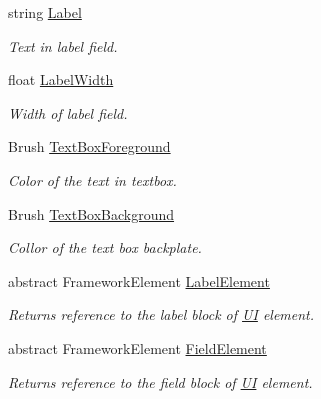 \begin{DoxyCompactItemize}
string \mbox{\hyperlink{class_wpf_handler_1_1_u_i_1_1_controls_1_1_text_field_control_a10cec1ad9b5fb5bb48d59e07d4cf2675}{Label}}
\begin{DoxyCompactList}\small\item\em Text in label field. \end{DoxyCompactList}\item 
float \mbox{\hyperlink{class_wpf_handler_1_1_u_i_1_1_controls_1_1_text_field_control_ab2089e6e1caddd925e2fa23d0ce481cb}{Label\+Width}}
\begin{DoxyCompactList}\small\item\em Width of label field. \end{DoxyCompactList}\item 
Brush \mbox{\hyperlink{class_wpf_handler_1_1_u_i_1_1_controls_1_1_text_field_control_a3ae60ed0a18d02385cb019fc9857b6d0}{Text\+Box\+Foreground}}
\begin{DoxyCompactList}\small\item\em Color of the text in textbox. \end{DoxyCompactList}\item 
Brush \mbox{\hyperlink{class_wpf_handler_1_1_u_i_1_1_controls_1_1_text_field_control_a15be413d59498274a43e43aebe172221}{Text\+Box\+Background}}
\begin{DoxyCompactList}\small\item\em Collor of the text box backplate. \end{DoxyCompactList}\item 
abstract Framework\+Element \mbox{\hyperlink{class_wpf_handler_1_1_u_i_1_1_controls_1_1_text_field_control_a7fcc5e59ea300a5660285170f98eb097}{Label\+Element}}
\begin{DoxyCompactList}\small\item\em Returns reference to the label block of \mbox{\hyperlink{namespace_wpf_handler_1_1_u_i}{UI}} element. \end{DoxyCompactList}\item 
abstract Framework\+Element \mbox{\hyperlink{class_wpf_handler_1_1_u_i_1_1_controls_1_1_text_field_control_aa2cb0bc5918aba314439476a88453bdb}{Field\+Element}}
\begin{DoxyCompactList}\small\item\em Returns reference to the field block of \mbox{\hyperlink{namespace_wpf_handler_1_1_u_i}{UI}} element. \end{DoxyCompactList}\end{DoxyCompactItemize}
